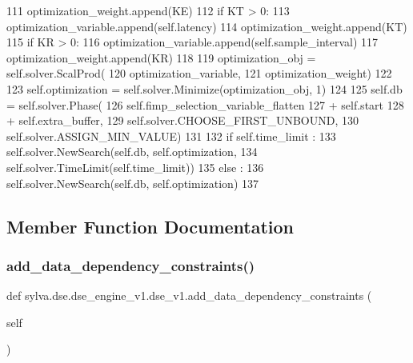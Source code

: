 \begin{DoxyCode}
111         optimization\_weight.append(KE)
112       \textcolor{keywordflow}{if} KT > 0:
113         optimization\_variable.append(self.latency)
114         optimization\_weight.append(KT)
115       \textcolor{keywordflow}{if} KR > 0:
116         optimization\_variable.append(self.sample\_interval)
117         optimization\_weight.append(KR)
118 
119       optimization\_obj = self.solver.ScalProd(
120         optimization\_variable,
121         optimization\_weight)
122 
123       self.optimization = self.solver.Minimize(optimization\_obj, 1)
124 
125     self.db = self.solver.Phase(
126                 self.fimp\_selection\_variable\_flatten
127                 + self.start
128                 + self.extra\_buffer,
129                 self.solver.CHOOSE\_FIRST\_UNBOUND,
130                 self.solver.ASSIGN\_MIN\_VALUE)
131 
132     \textcolor{keywordflow}{if} self.time\_limit :
133       self.solver.NewSearch(self.db, self.optimization,
134         self.solver.TimeLimit(self.time\_limit))
135     \textcolor{keywordflow}{else} :
136       self.solver.NewSearch(self.db, self.optimization)
137 
\end{DoxyCode}


\subsection{Member Function Documentation}
\mbox{\label{classsylva_1_1dse_1_1dse__engine__v1_1_1dse__v1_ad7941fd1c459dd2be5608fc7ed68d779}} 
\subsubsection{\texorpdfstring{add\+\_\+data\+\_\+dependency\+\_\+constraints()}{add\_data\_dependency\_constraints()}}
{\footnotesize\ttfamily def sylva.\+dse.\+dse\+\_\+engine\+\_\+v1.\+dse\+\_\+v1.\+add\+\_\+data\+\_\+dependency\+\_\+constraints (\begin{DoxyParamCaption}\item[{}]{self }\end{DoxyParamCaption})}



